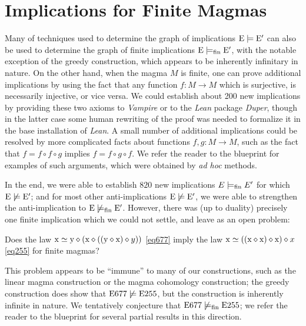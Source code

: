 \section{Implications for Finite Magmas}\label{austin-sec}

Many of techniques used to determine the graph of implications $\mathrm{E} \models \mathrm{E}'$ can also be used to determine the graph of finite implications $\mathrm{E} \models_{\mathrm{fin}} \mathrm{E}'$, with the notable exception of the greedy construction, which appears to be inherently infinitary in nature.  On the other hand, when the magma $M$ is finite, one can prove additional implications by using the fact that any function $f \colon M \to M$ which is surjective, is necessarily injective, or vice versa.  We could establish about 200 new implications by providing these two axioms to \emph{Vampire} or to the \emph{Lean} package \emph{Duper}, though in the latter case some human rewriting of the proof was needed to formalize it in the base installation of \emph{Lean}.  A small number of additional implications could be resolved by more complicated facts about functions $f,g \colon M \to M$, such as the fact that $f = f \circ f \circ g$ implies $f = f \circ g \circ f$.  We refer the reader to the blueprint for examples of such arguments, which were obtained by \emph{ad hoc} methods.

In the end, we were able to establish $820$ new implications $E \models_{\mathrm{fin}} E'$ for which $\mathrm{E} \not \models \mathrm{E}'$; and for most other anti-implications $\mathrm{E} \not \models \mathrm{E}'$, we were able to strengthen the anti-implication to $\mathrm{E} \not \models_{\mathrm{fin}} \mathrm{E}'$.  However, there was (up to duality) precisely one finite implication which we could not settle, and leave as an open problem:

\begin{problem}  Does the law $\mathrm{x} \simeq \mathrm{y} \diamond (\mathrm{x} \diamond ((\mathrm{y} \diamond \mathrm{x}) \diamond y))$ \eqref{eq677} imply the law $\mathrm{x} \simeq ((\mathrm{x} \diamond \mathrm{x}) \diamond \mathrm{x}) \diamond x$ \eqref{eq255} for finite magmas?
\end{problem}

This problem appears to be ``immune'' to many of our constructions, such as the linear magma construction or the magma cohomology construction; the greedy construction does show that $\mathrm{E}677 \not \models \mathrm{E}255$, but the construction is inherently infinite in nature.  We tentatively conjecture that $\mathrm{E}677 \not \models_{\mathrm{fin}} \mathrm{E}255$; we refer the reader to the blueprint for several partial results in this direction.

